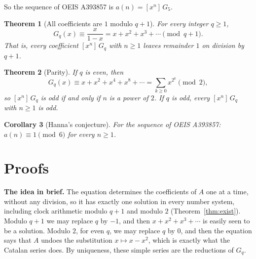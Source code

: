 \documentclass[11pt,a4paper]{article}
\newtheorem{theorem}{Theorem}[section]
\newtheorem{corollary}[theorem]{Corollary}
\theoremstyle{definition}
\theoremstyle{remark}
\newcommand{\coeff}[2]{[x^{#1}]\,#2}
\newcommand{\para}[1]{\par\medskip\noindent\textbf{#1}\enspace}
\begin{document}
So the sequence of OEIS A393857 is $a(n)=\coeff{n}{G_{5}}$.

\begin{theorem}[All coefficients are $1$ modulo $q+1$]\label{thm:mod}
For every integer $q\ge1$,
\[
G_q(x)\equiv\frac{x}{1-x}=x+x^2+x^3+\cdots\pmod{q+1}.
\]
That is, every coefficient $\coeff{n}{G_q}$ with $n\ge1$ leaves remainder $1$ on division by $q+1$.
\end{theorem}

\begin{theorem}[Parity]\label{thm:parity}
If $q$ is even, then
\[
G_q(x)\equiv x+x^2+x^4+x^8+\cdots=\sum_{k\ge0}x^{2^k}\pmod 2,
\]
so $\coeff{n}{G_q}$ is odd if and only if $n$ is a power of $2$. If $q$ is odd, every $\coeff{n}{G_q}$ with $n\ge1$
is odd.
\end{theorem}

\begin{corollary}[Hanna's conjecture]\label{cor:oeis}
For the sequence of OEIS A393857: $a(n)\equiv1\pmod{6}$ for every $n\ge1$.
\end{corollary}

\section{Proofs}\label{sec:proofs}

\para{The idea in brief.} The equation determines the coefficients of $A$ one at a time, without any division, so it
has exactly one solution in every number system, including clock arithmetic modulo $q+1$ and modulo $2$
(Theorem~\ref{thm:exist}). Modulo $q+1$ we may replace $q$ by $-1$, and then $x+x^2+x^3+\cdots$ is easily seen to be a
solution. Modulo $2$, for even $q$, we may replace $q$ by $0$, and then the equation says that $A$ undoes the
substitution $x\mapsto x-x^2$, which is exactly what the Catalan series does. By uniqueness, these simple series are
the reductions of $G_q$.
\end{document}
